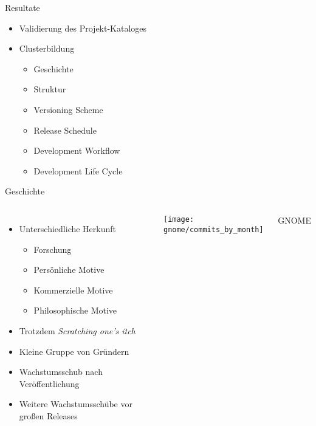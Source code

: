 \documentclass[11pt]{beamer}
\begin{document}
\begin{frame}{Resultate}
  \begin{itemize}
    \item Validierung des Projekt-Kataloges
    \item Clusterbildung
    \begin{itemize}
      \item Geschichte
      \item Struktur
      \item Versioning Scheme
      \item Release Schedule
      \item Development Workflow
      \item Development Life Cycle
    \end{itemize}
  \end{itemize}
\end{frame}

\begin{frame}{Geschichte}
  \begin{columns}
  \begin{itemize}
    \item Unterschiedliche Herkunft
    \begin{itemize}
      \item Forschung
      \item Persönliche Motive
      \item Kommerzielle Motive
      \item Philosophische Motive
    \end{itemize}
    \item Trotzdem \emph{Scratching one's itch}
    \item Kleine Gruppe von Gründern
    \item Wachstumsschub nach Veröffentlichung
    \item Weitere Wachstumsschübe vor großen Releases
  \end{itemize}
    \texttt{[image: gnome/commits\_by\_month]}

    {\tiny\hfill
    GNOME
    }
  \end{columns}
\end{frame}
\end{document}
